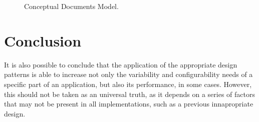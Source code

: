 \documentclass[9pt,a4paper]{extarticle}
\begin{document}
\begin{multicols}{2}
\begin{figure}[H]
  \caption{Conceptual Documents Model.}
  \label{fig:documents_conceptual}
\end{figure}

\section{Conclusion}\label{sec:conclusion}


It is also possible to conclude that the application of the appropriate design patterns is able to increase not only the variability and configurability needs of a specific part of an application, but also its performance, in some cases. However, this should not be taken as an universal truth, as it depends on a series of factors that may not be present in all implementations, such as a previous innapropriate design.



\end{multicols}
\end{document}
